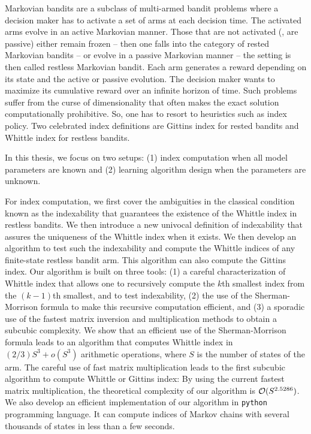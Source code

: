 Markovian bandits are a subclass of multi-armed bandit problems where a decision maker has to activate a set of arms at each decision time.
The activated arms evolve in an active Markovian manner.
Those that are not activated (\ie, are passive) either remain frozen -- then one falls into the category of rested Markovian bandits -- or evolve in a passive Markovian manner -- the setting is then called restless Markovian bandit.
Each arm generates a reward depending on its state and the active or passive evolution.
The decision maker wants to maximize its cumulative reward over an infinite horizon of time.
Such problems suffer from the curse of dimensionality that often makes the exact solution computationally prohibitive.
So, one has to resort to heuristics such as index policy.
Two celebrated index definitions are Gittins index for rested bandits and Whittle index for restless bandits.

In this thesis, we focus on two setups: (1) index computation when all model parameters are known and (2) learning algorithm design when the parameters are unknown.

For index computation, we first cover the ambiguities in the classical condition known as the indexability that guarantees the existence of the Whittle index in restless bandits.
We then introduce a new univocal definition of indexability that assures the uniqueness of the Whittle index when it exists.
We then develop an algorithm to test such the indexability and compute the Whittle indices of any finite-state restless bandit arm.
This algorithm can also compute the Gittins index.
Our algorithm is built on three tools: (1) a careful characterization of Whittle index that allows one to recursively compute the $k$th smallest index from the $(k − 1)$th smallest, and to test indexability, (2) the use of the Sherman-Morrison formula to make this recursive computation efficient, and (3) a sporadic use of the fastest matrix inversion and multiplication methods to obtain a subcubic complexity. We show that an efficient use of the Sherman-Morrison formula leads to an algorithm that computes Whittle index in $(2/3)S^3 + o(S^3)$ arithmetic operations, where $S$ is the number of states of the arm. The careful use of fast matrix multiplication leads to the first subcubic algorithm to compute Whittle or Gittins index: By using the current fastest matrix multiplication, the theoretical complexity of our algorithm is $\mathcal{O}(S^{2.5286})$. We also develop an efficient implementation of our algorithm in \texttt{python} programming language. It can compute indices of Markov chains with several thousands of states in less than a few seconds.

